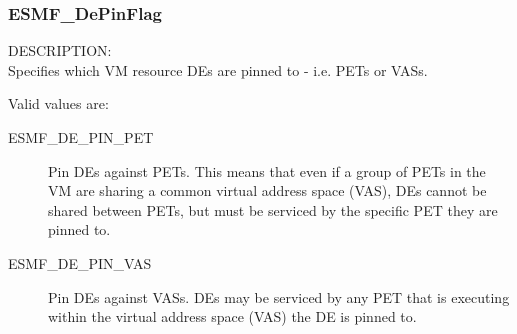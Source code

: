 

\subsubsection{ESMF\_DePinFlag}

\label{opt:depinflag}
{\sf DESCRIPTION:\\}
Specifies which VM resource DEs are pinned to - i.e. PETs or VASs.

Valid values are:
\begin{description}
   \item [ESMF\_DE\_PIN\_PET] 
         Pin DEs against PETs. This means that even if a group of PETs in the 
         VM are sharing a common virtual address space (VAS), DEs cannot
         be shared between PETs, but must be serviced by the specific PET they
         are pinned to.
   \item [ESMF\_DE\_PIN\_VAS]
         Pin DEs against VASs. DEs may be serviced by any PET that is 
         executing within the virtual address space (VAS) the DE is pinned to.
\end{description}

